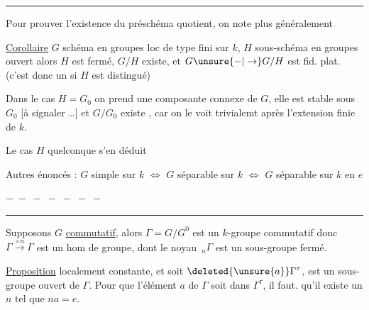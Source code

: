 \noindent\rule{1.15cm}{0.3pt}

Pour prouver l'existence du préschéma
quotient, on note plus généralement

\uline{Corollaire} \quad $G$ schéma en groupes loc de
type fini sur $k$, $H$ sous-schéma en
groupes ouvert  alors $H$ est
fermé,  $G/H$
existe, et $G\unsure{-|\to}G/H$ est fid. plat. (c'est
donc un  si $H$ est distingué)

 Dans le cas $H=G_0$
on prend une composante connexe de $G$,
elle est stable sous $G_0$ [à signaler \ldots]
et  $G/G_0$ existe , car on le
voit trivialemt après l'extension finie de $k$.

Le cas $H$ quelconque s'en déduit

 Autres énoncés : $G$ simple sur $k$
$\Longleftrightarrow$ $G$ séparable sur $k$ \unsure{;|,} $\Longleftrightarrow$ $G$ séparable sur $k$ en $e$

\begin{center}$-\;-\;-\;-\;-\;-\;-$\\[-2pt]\rule{2.5cm}{0.3pt}\end{center}

Supposons $G$ \uline{commutatif},  alors
$\Gamma=G/G^0$ est un  $k$-groupe commutatif 
donc $\Gamma\xrightarrow{\times n}\Gamma$ est un hom de groupe,
dont le noyau $\,{}_n\Gamma$ est un sous-groupe
fermé.

\uline{Proposition}  
localement constante, et 
soit $\deleted{\unsure{a}}\Gamma^\tau$, est un sous-groupe ouvert de
$\Gamma$. Pour que  l'élément $a$ de $\Gamma$
soit dans $\Gamma^\tau$, il faut.  qu'il
existe un $n$ tel que $na=e$.

